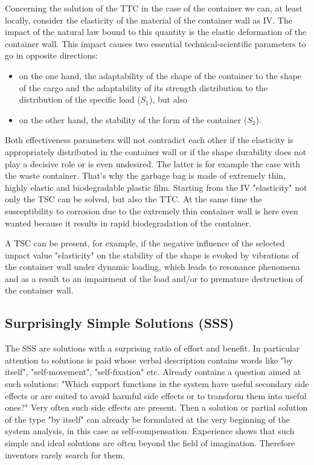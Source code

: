 \documentclass[11pt,a4paper]{article}
\begin{document}
Concerning the solution of the TTC in the case of the container we can, at
least locally, consider the elasticity of the material of the container wall
as IV. The impact of the natural law bound to this quantity is the elastic
deformation of the container wall. This impact causes two essential
technical-scientific parameters to go in opposite directions:
\begin{itemize}
\item on the one hand, the adaptability of the shape of the container to the
  shape of the cargo and the adaptability of its strength distribution to
  the distribution of the specific load ($S_1$), but also
\item on the other hand, the stability of the form of the container ($S_2$).
\end{itemize}
\newpage
Both effectiveness parameters will not contradict each other if the elasticity
is appropriately distributed in the container wall or if the shape durability
does not play a decisive role or is even undesired. The latter is for example
the case with the waste container. That's why the garbage bag is made of
extremely thin, highly elastic and biodegradable plastic film.  Starting from
the IV "elasticity" not only the TSC can be solved, but also the TTC.  At the
same time the susceptibility to corrosion due to the extremely thin container
wall is here even wanted because it results in rapid biodegradation of the
container.

A TSC can be present, for example, if the negative influence of the selected
impact value "elasticity" on the stability of the shape is evoked by
vibrations of the container wall under dynamic loading, which leads to
resonance phenomena and as a result to an impairment of the load and/or to
premature destruction of the container wall.

\subsection{Surprisingly Simple Solutions (SSS)}

The SSS are solutions with a surprising ratio of effort and benefit.  In
\cite[(6.4),(9.3)]{RM-21} particular attention to solutions is paid whose
verbal description contains words like "by itself", "self-movement",
"self-fixation" etc.  Already \cite[(2.14)]{RM-21} contains a question aimed
at such solutions: "Which support functions in the system have useful
secondary side effects or are suited to avoid harmful side effects or to
transform them into useful ones?" Very often such side effects are present.
Then a solution or partial solution of the type "by itself" can already be
formulated at the very beginning of the system analysis, in this case as
self-compensation.  Experience shows that such simple and ideal solutions are
often beyond the field of imagination.  Therefore inventors rarely search for
them.
\end{document}
